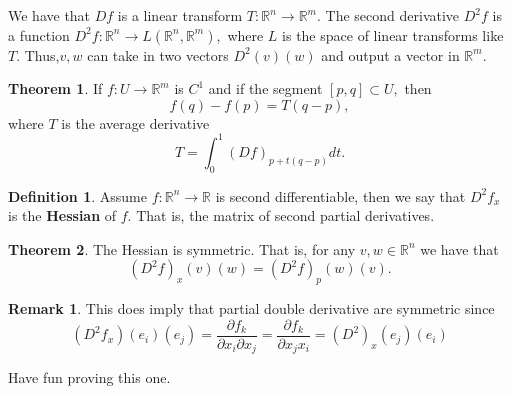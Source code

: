\documentclass[10pt, oneside]{article}
\newcommand{\bbR}{\mathbb{R}}
\theoremstyle{definition}
\newtheorem{thm}{Theorem}
\newtheorem{defn}{Definition}
\newtheorem{rem}{Remark}
\begin{document}
We have that $Df$ is a linear transform $T: \bbR^n \to \bbR^m.$ The second derivative $D^2f$ is a function $D^2f: \bbR^n \to L(\bbR^n, \bbR^m),$ where $L$ is the space of linear transforms like $T.$ Thus,$v,w$ can take in two vectors $D^2(v)(w)$ and output a vector in $\bbR^m.$
\begin{thm}
    If $f: U \to \bbR^m$ is $C^1$ and if the segment $[p,q]\subset U,$ then 
    \[f(q) - f(p) = T(q-p),\] where $T$ is the average derivative
    \[T = \int_0^1(Df)_{p + t(q-p)}dt.\]
\end{thm}
\begin{defn}
    Assume $f: \bbR^n \to \bbR$ is second differentiable, then we say that $D^2f_x$ is the \textbf{Hessian} of $f.$ That is, the matrix of second partial derivatives.
\end{defn}
\begin{thm}
    The Hessian is symmetric. That is, for any $v, w \in \bbR^n$ we have that 
    \[(D^2f)_x(v)(w) = (D^2f)_p(w)(v).\]
\end{thm}
\begin{rem}
    This does imply that partial double derivative are symmetric since 
    \[(D^2f_x)(e_i)(e_j) = \frac{\partial f_k}{\partial x_i \partial x_j} = \frac{\partial f_k}{\partial x_j x_i} = (D^2)_x(e_j)(e_i)\]
\end{rem}
Have fun proving this one.
    
\newpage
\end{document}

